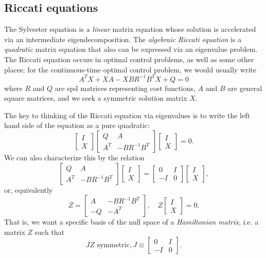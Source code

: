 \documentclass[12pt, leqno]{article} %
\begin{document}
\subsection{Riccati equations}

The Sylvester equation is a {\em linear} matrix equation whose solution
is accelerated via an intermediate eigendecomposition.  The
{\em algebraic Riccati equation} is a {\em quadratic} matrix equation
that also can be expressed via an eigenvalue problem.  The Riccati
equation occurs in optimal control problems, as well as some other places;
for the continuous-time optimal control problem, we would usually write
\[
  A^T X + XA - XBR^{-1} B^T X + Q = 0
\]
where $R$ and $Q$ are spd matrices representing cost functions,
$A$ and $B$ are general square matrices, and we seek a symmetric solution
matrix $X$.

The key to thinking of the Riccati equation via eigenvalues is to write
the left hand side of the equation as a pure quadratic:
\[
  \begin{bmatrix} I \\ X \end{bmatrix}
  \begin{bmatrix} Q & A \\ A^T & -BR^{-1}B^T \end{bmatrix}
  \begin{bmatrix} I \\ X \end{bmatrix} = 0.
\]
We can also characterize this by the relation
\[
  \begin{bmatrix} Q & A \\ A^T & -BR^{-1} B^T \end{bmatrix}
  \begin{bmatrix} I \\ X \end{bmatrix} =
  \begin{bmatrix} 0 & I \\ -I & 0 \end{bmatrix}
  \begin{bmatrix} I \\ X \end{bmatrix},
\]
or, equivalently
\[
  Z = \begin{bmatrix}
    A & -BR^{-1} B^T \\
    -Q & -A^T
  \end{bmatrix}, \quad Z 
  \begin{bmatrix} I \\ X \end{bmatrix} = 0.
\]
That is, we want a specific basis of the null space of
a {\em Hamiltonian matrix}, i.e. a matrix $Z$ such that
\[
  JZ \mbox{ symmetric}, J \equiv \begin{bmatrix} 0 & I \\ -I & 0 \end{bmatrix}.
\]
\end{document}
